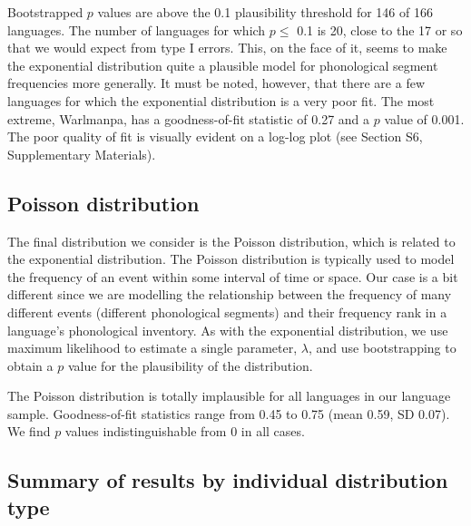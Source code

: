 Bootstrapped \(p\) values are above the 0.1 plausibility threshold for 146 of 166 languages. The number of languages for which \(p \leq\) 0.1 is 20, close to the 17 or so that we would expect from type I errors. This, on the face of it, seems to make the exponential distribution quite a plausible model for phonological segment frequencies more generally. It must be noted, however, that there are a few languages for which the exponential distribution is a very poor fit. The most extreme, Warlmanpa, has a goodness-of-fit statistic of 0.27 and a \(p\) value of 0.001. The poor quality of fit is visually evident on a log-log plot (see Section S6, Supplementary Materials). \newline

\hypertarget{poisson-distribution}{%
\subsection*{Poisson distribution}\label{poisson-distribution}}

The final distribution we consider is the Poisson distribution, which is related to the exponential distribution. The Poisson distribution is typically used to model the frequency of an event within some interval of time or space. Our case is a bit different since we are modelling the relationship between the frequency of many different events (different phonological segments) and their frequency rank in a language's phonological inventory. As with the exponential distribution, we use maximum likelihood to estimate a single parameter, \(\lambda\), and use bootstrapping to obtain a \(p\) value for the plausibility of the distribution.

The Poisson distribution is totally implausible for all languages in our language sample. Goodness-of-fit statistics range from 0.45 to 0.75 (mean 0.59, SD 0.07). We find \(p\) values indistinguishable from 0 in all cases. \newline

\hypertarget{summary-of-results-by-individual-distribution-type}{%
\subsection*{Summary of results by individual distribution type}\label{summary-of-results-by-individual-distribution-type}}

